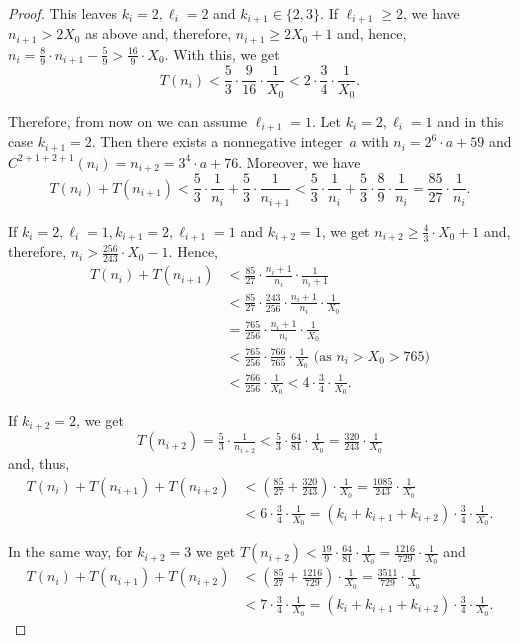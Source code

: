 \documentclass[12pt,reqno]{article}
\begin{document}
\begin{proof}
This leaves $k_i=2, \ell_i=2$ and $k_{i+1}\in\{2,3\}$. If $\ell_{i+1}\geq 2$, we have $n_{i+1}>2X_0$ as above and, therefore, $n_{i+1}\geq 2X_0+1$ and, hence, $n_i=\tfrac{8}{9} \cdot n_{i+1}-\tfrac{5}{9}>\tfrac{16}{9} \cdot X_0$. With this, we get
\[T(n_i) < \frac{5}{3} \cdot \frac{9}{16} \cdot \frac{1}{X_0} < 2 \cdot \frac{3}{4}  \cdot \frac{1}{X_0}.\]

Therefore, from now on we can assume $\ell_{i+1}=1$. Let $k_i=2, \ell_i=1$ and in this case $k_{i+1}=2$. Then there exists a nonnegative integer~$a$ with $n_i=2^6 \cdot a + 59$ and $C^{2+1+2+1}(n_i)=n_{i+2}=3^4 \cdot a + 76$. Moreover, we have 
\[T(n_i)+T(n_{i+1})< \frac{5}{3} \cdot \frac{1}{n_i}+ \frac{5}{3} \cdot \frac{1}{n_{i+1}}<\frac{5}{3} \cdot \frac{1}{n_i}+ \frac{5}{3} \cdot \frac{8}{9} \cdot \frac{1}{n_{i}}=\frac{85}{27} \cdot \frac{1}{n_i}.\]

If $k_i=2, \ell_i=1, k_{i+1}=2, \ell_{i+1}=1$ and $k_{i+2}=1$, we get $n_{i+2}\geq \tfrac{4}{3} \cdot X_0+1$ and, therefore, $n_i> \tfrac{256}{243} \cdot X_0 -1$. Hence,
\begin{align*}
T(n_i)+T(n_{i+1})&< \frac{85}{27} \cdot \frac{n_i+1}{n_i} \cdot \frac{1}{n_i+1} \\
\quad &< \frac{85}{27} \cdot \frac{243}{256} \cdot \frac{n_i+1}{n_i} \cdot \frac{1}{X_0}\\
\quad &= \frac{765}{256} \cdot \frac{n_i+1}{n_i} \cdot \frac{1}{X_0}\\
\quad &< \frac{765}{256} \cdot \frac{766}{765} \cdot \frac{1}{X_0}\text{ (as $n_i>X_0>765$)}\\
\quad &< \frac{766}{256} \cdot \frac{1}{X_0} < 4\cdot \frac{3}{4} \cdot \frac{1}{X_0}.
\end{align*}

If $k_{i+2}=2$, we get 
\[T(n_{i+2})=\tfrac{5}{3} \cdot \tfrac{1}{n_{i+2}}<\tfrac{5}{3} \cdot \tfrac{64}{81} \cdot \tfrac{1}{X_0}=\tfrac{320}{243} \cdot \tfrac{1}{X_0}\]
and, thus,
\begin{align*}
T(n_i)+T(n_{i+1})+T(n_{i+2})&<\left( \frac{85}{27} + \frac{320}{243}\right)\cdot \frac{1}{X_0} = \frac{1085}{243} \cdot \frac{1}{X_0}\\
\quad &<6 \cdot \frac{3}{4}\cdot \frac{1}{X_0} = (k_i+k_{i+1}+k_{i+2}) \cdot \frac{3}{4}\cdot \frac{1}{X_0}.
\end{align*}

In the same way, for $k_{i+2}=3$ we get $T(n_{i+2})<\tfrac{19}{9} \cdot \tfrac{64}{81} \cdot \tfrac{1}{X_0}=\tfrac{1216}{729} \cdot \tfrac{1}{X_0}$ and
\begin{align*}
T(n_i)+T(n_{i+1})+T(n_{i+2})&<\left( \frac{85}{27} + \frac{1216}{729}\right)\cdot \frac{1}{X_0} = \frac{3511}{729} \cdot \frac{1}{X_0}\\
\quad &<7 \cdot \frac{3}{4}\cdot \frac{1}{X_0} = (k_i+k_{i+1}+k_{i+2}) \cdot \frac{3}{4}\cdot \frac{1}{X_0}.
\end{align*}


\end{proof}
\end{document}
